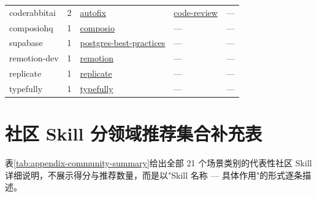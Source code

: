\documentclass[UTF8,a4paper,12pt]{ctexart}
\begin{document}
\begin{longtable}{p{2.8cm} r p{4.2cm} p{4.2cm} p{4.2cm}}
coderabbitai & 2 & \href{https://officialskills.sh/coderabbitai/skills/autofix}{autofix} & \href{https://officialskills.sh/coderabbitai/skills/code-review}{code-review} & — \\
composiohq & 1 & \href{https://officialskills.sh/composiohq/skills/composio}{composio} & — & — \\
supabase & 1 & \href{https://officialskills.sh/supabase/skills/postgres-best-practices}{postgres-best-practices} & — & — \\
remotion-dev & 1 & \href{https://officialskills.sh/remotion-dev/skills/remotion}{remotion} & — & — \\
replicate & 1 & \href{https://officialskills.sh/replicate/skills/replicate}{replicate} & — & — \\
typefully & 1 & \href{https://officialskills.sh/typefully/skills/typefully}{typefully} & — & — \\
\bottomrule
\end{longtable}

\section{社区 Skill 分领域推荐集合补充表}

表\ref{tab:appendix-community-summary}给出全部 21 个场景类别的代表性社区 Skill 详细说明，不展示得分与推荐数量，而是以"Skill 名称 — 具体作用"的形式逐条描述。
\end{document}
